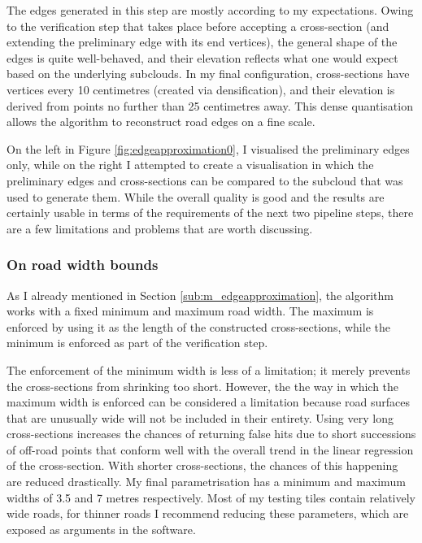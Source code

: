 The edges generated in this step are mostly according to my expectations. Owing to the verification step that takes place before accepting a cross-section (and extending the preliminary edge with its end vertices), the general shape of the edges is quite well-behaved, and their elevation reflects what one would expect based on the underlying subclouds. In my final configuration, cross-sections have vertices every 10 centimetres (created via densification), and their elevation is derived from points no further than 25 centimetres away. This dense quantisation allows the algorithm to reconstruct road edges on a fine scale.

On the left in Figure \ref{fig:edgeapproximation0}, I visualised the preliminary edges only, while on the right I attempted to create a visualisation in which the preliminary edges and cross-sections can be compared to the subcloud that was used to generate them. While the overall quality is good and the results are certainly usable in terms of the requirements of the next two pipeline steps, there are a few limitations and problems that are worth discussing.

\subsubsection{On road width bounds}

As I already mentioned in Section \ref{sub:m_edgeapproximation}, the algorithm works with a fixed minimum and maximum road width. The maximum is enforced by using it as the length of the constructed cross-sections, while the minimum is enforced as part of the verification step.

The enforcement of the minimum width is less of a limitation; it merely prevents the cross-sections from shrinking too short. However, the the way in which the maximum width is enforced can be considered a limitation because road surfaces that are unusually wide will not be included in their entirety. Using very long cross-sections increases the chances of returning false hits due to short successions of off-road points that conform well with the overall trend in the linear regression of the cross-section. With shorter cross-sections, the chances of this happening are reduced drastically. My final parametrisation has a minimum and maximum widths of 3.5 and 7 metres respectively. Most of my testing tiles contain relatively wide roads, for thinner roads I recommend reducing these parameters, which are exposed as arguments in the software.

